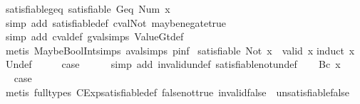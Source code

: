 \begin{isabellebody}
\endisatagproof
{\isafoldproof}%
%
\isadelimproof
\isanewline
%
\endisadelimproof
\isanewline
{}\isamarkupfalse%
\ satisfiable{\isacharunderscore}geq{\isacharcolon}\ {\isachardoublequoteopen}satisfiable\ {\isacharparenleft}Geq\ {\isacharparenleft}Num\ x{\isacharparenright}{\isacharparenright}{\isachardoublequoteclose}\isanewline
%
\isadelimproof
\ \ %
\endisadelimproof
%
\isatagproof
{}\isamarkupfalse%
\ {\isacharparenleft}simp\ add{\isacharcolon}\ satisfiable{\isacharunderscore}def\ cval{\isacharunderscore}Not\ maybe{\isacharunderscore}negate{\isacharunderscore}true{\isacharparenright}\isanewline
\ \ \isamarkupfalse%
\ {\isacharparenleft}simp\ add{\isacharcolon}\ cval{\isacharunderscore}def\ gval{\isachardot}simps\ ValueGt{\isacharunderscore}def{\isacharparenright}\isanewline
\ \ \isamarkupfalse%
\ {\isacharparenleft}metis\ MaybeBoolInt{\isachardot}simps{\isacharparenleft}{}{\isacharparenright}\ aval{\isachardot}simps{\isacharparenleft}{}{\isacharparenright}\ pinf{\isacharparenleft}{}{\isacharparenright}{\isacharparenright}%
\endisatagproof
{\isafoldproof}%
%
\isadelimproof
\isanewline
%
\endisadelimproof
\isanewline
{}\isamarkupfalse%
\ {\isachardoublequoteopen}satisfiable\ {\isacharparenleft}Not\ x{\isacharparenright}\ {\isasymLongrightarrow}\ {\isasymnot}valid\ x{\isachardoublequoteclose}\isanewline
%
\isadelimproof
%
\endisadelimproof
%
\isatagproof
{}\isamarkupfalse%
{\isacharparenleft}induct\ x{\isacharparenright}\isanewline
{}\isamarkupfalse%
\ Undef\isanewline
\ \ \isamarkupfalse%
\ \isamarkupfalse%
\ {\isacharquery}case\isanewline
\ \ \ \ \isamarkupfalse%
\ {\isacharparenleft}simp\ add{\isacharcolon}\ invalid{\isacharunderscore}undef\ satisfiable{\isacharunderscore}not{\isacharunderscore}undef{\isacharparenright}\isanewline
{}\isamarkupfalse%
\isanewline
\ \ \isamarkupfalse%
\ {\isacharparenleft}Bc\ x{\isacharparenright}\isanewline
\ \ \isamarkupfalse%
\ \isamarkupfalse%
\ {\isacharquery}case\isanewline
\ \ \ \ \isamarkupfalse%
\ {\isacharparenleft}metis\ {\isacharparenleft}full{\isacharunderscore}types{\isacharparenright}\ CExp{\isachardot}satisfiable{\isacharunderscore}def\ false{\isacharunderscore}not{\isacharunderscore}true\ invalid{\isacharunderscore}false\ \ unsatisfiable{\isacharunderscore}false{\isacharparenright}\isanewline
{}\isamarkupfalse%
\isanewline

\end{isabellebody}
